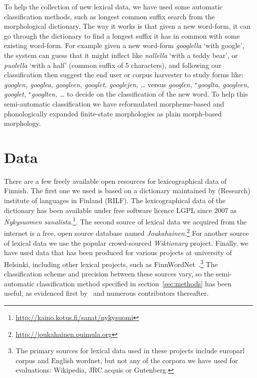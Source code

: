 \documentclass[a4paper,12pt]{article}
\begin{document}
To help the collection of new lexical data, we have used some automatic
classification methods, such as longest common suffix search from the
morphological dictionary.  The way it works is that given a new word-form, it
can go through the dictionary to find a longest suffix it has in common with
some existing word-form. For example  given a new word-form \emph{googlella}
`with google', the system can guess that it might inflect like \emph{nallella} `with
a teddy bear', or \emph{puolella} `with a half' (common suffix of 5
characters), and following our classification then suggest the end user or corpus
harvester to study forms like: \emph{googlen, googlea, googleen, googlet,
googlejen, \ldots} versus \emph{googlen, ${}^\star$googlta, googleen, googlet,
${}^\star$googlten, \ldots} to decide on the classification of the new word. To
help this semi-automatic classification we have reformulated morpheme-based and
phonologically expanded finite-state morphologies as plain morph-based
morphology.

\section{Data}
\label{sec:data}

There are a few freely available open resources for lexicographical data of
Finnish. The first one  we used is based on a dictionary maintained by (Research)
institute of languages in Finland (RILF). The lexicographical data of the
dictionary has been available under free software licence LGPL since 2007 as
\emph{Nykysuomen
sanalista.}\footnote{\url{http://kaino.kotus.fi/sanat/nykysuomi}}.  The second
source of lexical data we acquired from the internet is a free, open source
database named
\emph{Joukahainen.}\footnote{\url{http://joukahainen.puimula.org}}  For another
source of lexical data we use the popular crowd-sourced \emph{Wiktionary}
project.  Finally, we have used data that has been produced for various
projects at university of Helsinki, including other lexical projects, such as
FinnWordNet~\citep{linden2010finnwordnet}.\footnote{The primary sources for
lexical data used in these projects include europarl corpus and English
wordnet, but not any of the corpora we have used for evaluations: Wikipedia,
JRC acquis or Gutenberg.} The classification scheme and precision between
these sources vary, so the semi-automatic classification method specified in
section~\ref{sec:methods} has been useful, as evidenced first
by~\citet{listenmaa2009combining} and numerous contributors thereafter.
\end{document}
